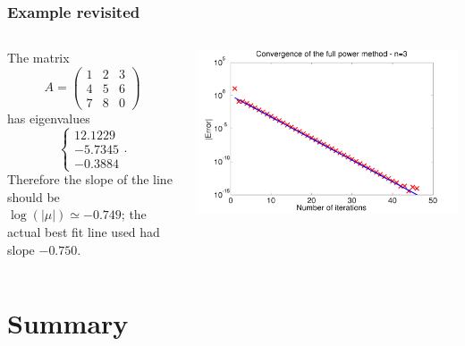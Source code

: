\documentclass{beamer}
\begin{document}
\begin{frame}
  \frametitle{Example revisited}

  \begin{columns}
    \begin{column}{0.35\textwidth}
      The matrix
      \begin{equation*}
        A =
        \begin{pmatrix}
          1 & 2 & 3 \\
          4 & 5 & 6 \\
          7 & 8 & 0
        \end{pmatrix}
      \end{equation*}
      has eigenvalues
      \begin{equation*}
        \left\{
          \begin{array}{c}
            12.1229\\ -5.7345\\ -0.3884
          \end{array}\right. .
      \end{equation*}
      Therefore the slope of the line should be $\log(|\mu|) \simeq
      -0.749$; the actual best fit line used had slope $-0.750$.
    \end{column}
    \begin{column}{0.65\textwidth}
      \includegraphics[width=\textwidth]{figures/PowerFull1}
    \end{column}
  \end{columns}
\end{frame}


\section{Summary}
\end{document}

